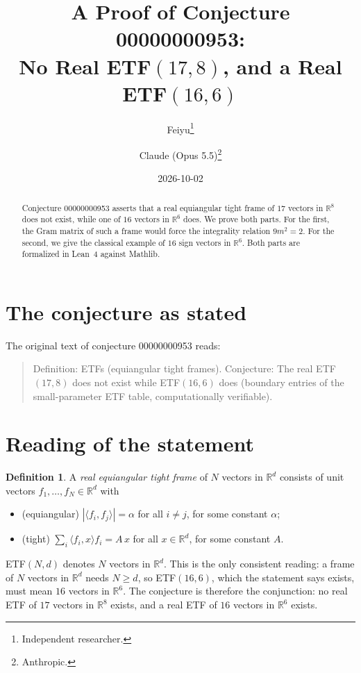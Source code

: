 \documentclass[11pt]{article}
\title{A Proof of Conjecture 00000000953:\\
No Real ETF$(17,8)$, and a Real ETF$(16,6)$}
\author{%
  Feiyu\thanks{Independent researcher.}
  \and
  Claude (Opus 5.5)\thanks{Anthropic.}%
}
\date{2026-10-02}
\theoremstyle{plain}
\theoremstyle{definition}
\newtheorem{definition}[theorem]{Definition}
\theoremstyle{remark}
\newcommand{\ip}[2]{\langle #1,#2\rangle}
\begin{document}
\maketitle

\begin{abstract}
Conjecture 00000000953 asserts that a real equiangular tight frame of $17$
vectors in $\mathbb R^8$ does not exist, while one of $16$ vectors in
$\mathbb R^6$ does. We prove both parts. For the first, the Gram matrix of such a
frame would force the integrality relation $9m^2=2$. For the second, we give
the classical example of $16$ sign vectors in $\mathbb R^6$. Both parts are
formalized in Lean~4 against Mathlib.
\end{abstract}

\section{The conjecture as stated}

The original text of conjecture 00000000953 reads:

\begin{quote}
Definition: ETFs (equiangular tight frames). Conjecture: The real ETF$(17, 8)$
does not exist while ETF$(16, 6)$ does (boundary entries of the small-parameter
ETF table, computationally verifiable).
\end{quote}

\section{Reading of the statement}

\begin{definition}
A \emph{real equiangular tight frame} of $N$ vectors in $\mathbb R^d$ consists
of unit vectors $f_1,\ldots,f_N\in\mathbb R^d$ with
\begin{itemize}
  \item (equiangular) $|\ip{f_i}{f_j}|=\alpha$ for all $i\ne j$, for some
    constant $\alpha$;
  \item (tight) $\sum_i\ip{f_i}{x}f_i=A\,x$ for all $x\in\mathbb R^d$, for some
    constant $A$.
\end{itemize}
\end{definition}

ETF$(N,d)$ denotes $N$ vectors in $\mathbb R^d$. This is the only consistent
reading: a frame of $N$ vectors in $\mathbb R^d$ needs $N\ge d$, so ETF$(16,6)$,
which the statement says exists, must mean $16$ vectors in $\mathbb R^6$. The
conjecture is therefore the conjunction: no real ETF of $17$ vectors in
$\mathbb R^8$ exists, and a real ETF of $16$ vectors in $\mathbb R^6$ exists.
\end{document}
